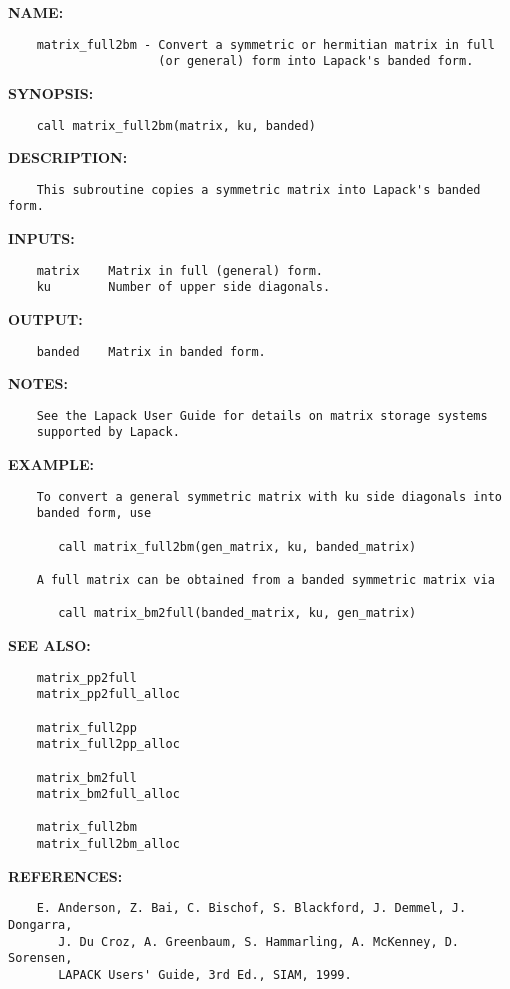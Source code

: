 \label{ch:robo18}
\label{ch:Matrices_matrix_full2bm}
\textbf{NAME:}\hspace{0.08in}\begin{Verbatim}
    matrix_full2bm - Convert a symmetric or hermitian matrix in full
                     (or general) form into Lapack's banded form.
\end{Verbatim}
\textbf{SYNOPSIS:}\hspace{0.08in}\begin{Verbatim}
    call matrix_full2bm(matrix, ku, banded)
\end{Verbatim}
\textbf{DESCRIPTION:}\hspace{0.08in}\begin{Verbatim}
    This subroutine copies a symmetric matrix into Lapack's banded form.
\end{Verbatim}
\textbf{INPUTS:}\hspace{0.08in}\begin{Verbatim}
    matrix    Matrix in full (general) form.
    ku        Number of upper side diagonals.
\end{Verbatim}
\textbf{OUTPUT:}\hspace{0.08in}\begin{Verbatim}
    banded    Matrix in banded form.
\end{Verbatim}
\textbf{NOTES:}\hspace{0.08in}\begin{Verbatim}
    See the Lapack User Guide for details on matrix storage systems
    supported by Lapack. 
\end{Verbatim}
\textbf{EXAMPLE:}\hspace{0.08in}\begin{Verbatim}
    To convert a general symmetric matrix with ku side diagonals into 
    banded form, use

       call matrix_full2bm(gen_matrix, ku, banded_matrix)

    A full matrix can be obtained from a banded symmetric matrix via

       call matrix_bm2full(banded_matrix, ku, gen_matrix)
\end{Verbatim}
\textbf{SEE ALSO:}\hspace{0.08in}\begin{Verbatim}
    matrix_pp2full
    matrix_pp2full_alloc

    matrix_full2pp
    matrix_full2pp_alloc

    matrix_bm2full
    matrix_bm2full_alloc

    matrix_full2bm
    matrix_full2bm_alloc
\end{Verbatim}
\textbf{REFERENCES:}\hspace{0.08in}\begin{Verbatim}
    E. Anderson, Z. Bai, C. Bischof, S. Blackford, J. Demmel, J. Dongarra,
       J. Du Croz, A. Greenbaum, S. Hammarling, A. McKenney, D. Sorensen,
       LAPACK Users' Guide, 3rd Ed., SIAM, 1999.
\end{Verbatim}
